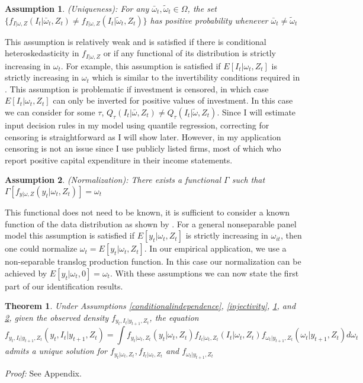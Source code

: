 \documentclass{article}
\newtheorem{assump}{Assumption}[section]
\newtheorem{theorem}{Theorem}[section]
\begin{document}
\begin{assump} \label{uniqueness} (Uniqueness): For any $\bar{\omega}_{t}, \tilde{\omega}_{t}\in \Omega$, the set $\{f_{I|\omega, Z}(I_{t}|\bar{\omega}_{t}, Z_{t})\neq f_{I|\omega, Z}(I_{t}|\tilde{\omega}_{t}, Z_{t})\}$ has positive probability whenever $\bar{\omega}_{t}\neq\tilde{\omega}_{t}$
\end{assump}
This assumption is relatively weak and is satisfied if there is conditional heteroskedasticity in $f_{I|\omega, Z}$ or if any functional of its distribution is strictly increasing in $\omega_{t}$. For example, this assumption is satisfied if $E[I_{t}|\omega_{t},Z_{t}]$ is strictly increasing in $\omega_{t}$ which is similar to the invertibility conditions required in \cite{Olley1996}. This assumption is problematic if investment is censored, in which case $E[I_{t}|\omega_{t},Z_{t}]$ can only be inverted for positive values of investment. In this case we can consider for some $\tau$, $Q_{\tau}(I_{t}|\bar{\omega}, Z_{t})\neq Q_{\tau}(I_{t}|\tilde{\omega}, Z_{t})$. Since I will estimate input decision rules in my model using quantile regression, correcting for censoring is straightforward as I will show later. However, in my application censoring is not an issue since I use publicly listed firms, most of which who report positive capital expenditure in their income statements.

\begin{assump} \label{normalization} (Normalization): There exists a functional $\Gamma$ such that $\Gamma[f_{y|\omega,Z}(y_{t}|\omega_{t}, Z_{t})]=\omega_{t}$
\end{assump}
This functional does not need to be known, it is sufficient to consider a known function of the data distribution as shown by \cite{Arellano2016}. For a general nonseparable panel model this assumption is satisfied if $E[y_{t}|\omega_{t}, Z_{t}]$ is strictly increasing in $\omega_{it}$, then one could normalize $\omega_{t}=E[y_{t}|\omega_{t}, Z_{t}]$. In our empirical application, we use a non-separable translog production function. In this case our normalization can be achieved by $E[y_{t}|\omega_{t}, 0]=\omega_{t}$. With these assumptions we can now state the first part of our identification results.

\begin{theorem} \label{idpart1} Under Assumptions \ref{conditionalindependence}, \ref{injectivity}, \ref{uniqueness}, and \ref{normalization}, given the observed density $f_{y_{t}, I_{t}|y_{t+1}, Z_{t}}$, the equation
\begin{equation}
f_{y_{t}, I_{t}|y_{t+1}, Z_{t}}(y_{t}, I_{t}|y_{t+1}, Z_{t})=\int f_{y_{t}|\omega_{t}, Z_{t}}(y_{t}|\omega_{t}, Z_{t})f_{I_{t}|\omega_{t}, Z_{t}}(I_{t}|\omega_{t}, Z_{t})f_{\omega_{t}|y_{t+1}, Z_{t}}(\omega_{t}|y_{t+1}, Z_{t})d\omega_{t}
\end{equation}
admits a unique solution for $f_{y_{t}|\omega_{t}, Z_{t}}, f_{I_{t}|\omega_{t}, Z_{t}}$ and $f_{\omega_{t}|y_{t+1}, Z_{t}}$
\end{theorem}
\textit{Proof:} See Appendix.\\
\end{document}
